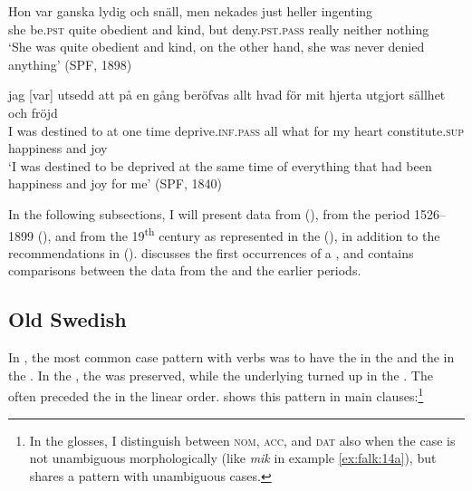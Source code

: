\documentclass[output=paper]{langscibook}
\begin{document}
\ea%
    \label{ex:falk:13}
\ea \label{ex:falk:13a}
\gll Hon  var      ganska  lydig      och  snäll,  men  nekades      just    heller ingenting\\
 she  be\textsc{.pst}  quite    obedient  and  kind,  but  deny.\textsc{pst.pass}  really    neither        nothing\\
\glt ‘She was quite obedient and kind, on the other hand, she was never denied anything’ (SPF, 1898)

\ex \label{ex:falk:13b}
\gll jag [var]   utsedd  att  på  en    gång  beröfvas            allt  hvad  för   mit  hjerta utgjort         sällhet    och  fröjd\\
I    was  destined  to  at  one  time  deprive\textsc{.inf.pass}  all    what  for   my  heart    constitute.\textsc{sup}    happiness  and  joy\\
\glt ‘I was destined to be deprived at the same time of everything that had been happiness and joy for me’ (SPF, 1840)
\z
\z


In the following subsections, I will present data from  (), from the period 1526–1899 (), and from the 19\textsuperscript{th} century as represented in the  (), in addition to the recommendations in  ().  discusses the first occurrences of a , and  contains comparisons between the data from the  and the earlier periods.

\subsection{Old Swedish}\label{sec:falk:3.3}


In , the most common case pattern with  verbs was to have the  in the  and the  in the . In the , the  was preserved, while the underlying  turned up in the . The  often preceded the  in the linear order.  shows this pattern in main clauses:\footnote{In the glosses, I distinguish between \textsc{nom,} \textsc{acc,} and \textsc{dat} also when the case is not unambiguous morphologically (like \textit{mik} in example \ref{ex:falk:14a}), but shares a pattern with unambiguous cases.}
\end{document}
